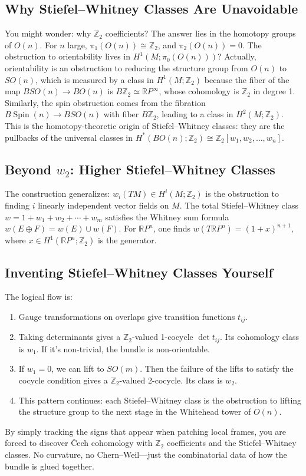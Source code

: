 \documentclass[11pt]{article}
\newcommand{\R}{\mathbb{R}}
\newcommand{\Z}{\mathbb{Z}}
\begin{document}
\subsection{Why Stiefel--Whitney Classes Are Unavoidable}
You might wonder: why \(\Z_2\) coefficients? The answer lies in the homotopy groups of \(O(n)\). For \(n\) large, \(\pi_1(O(n)) \cong \Z_2\), and \(\pi_2(O(n)) = 0\). The obstruction to orientability lives in \(H^1(M;\pi_0(O(n)))\)? Actually, orientability is an obstruction to reducing the structure group from \(O(n)\) to \(SO(n)\), which is measured by a class in \(H^1(M;\Z_2)\) because the fiber of the map \(BSO(n) \to BO(n)\) is \(B\Z_2 \simeq \R P^\infty\), whose cohomology is \(\Z_2\) in degree 1. Similarly, the spin obstruction comes from the fibration \(B\operatorname{Spin}(n) \to BSO(n)\) with fiber \(B\Z_2\), leading to a class in \(H^2(M;\Z_2)\). This is the homotopy-theoretic origin of Stiefel--Whitney classes: they are the pullbacks of the universal classes in \(H^*(BO(n);\Z_2) \cong \Z_2[w_1,w_2,\dots,w_n]\).

\subsection{Beyond \(w_2\): Higher Stiefel--Whitney Classes}
The construction generalizes: \(w_i(TM) \in H^i(M;\Z_2)\) is the obstruction to finding \(i\) linearly independent vector fields on \(M\). The total Stiefel--Whitney class \(w = 1 + w_1 + w_2 + \cdots + w_m\) satisfies the Whitney sum formula \(w(E\oplus F) = w(E) \cup w(F)\). For \(\R P^n\), one finds \(w(T\R P^n) = (1+x)^{n+1}\), where \(x \in H^1(\R P^n;\Z_2)\) is the generator.

\subsection{Inventing Stiefel--Whitney Classes Yourself}
The logical flow is:
\begin{enumerate}
    \item Gauge transformations on overlaps give transition functions \(t_{ij}\).
    \item Taking determinants gives a \(\Z_2\)-valued 1-cocycle \(\det t_{ij}\). Its cohomology class is \(w_1\). If it's non-trivial, the bundle is non-orientable.
    \item If \(w_1 = 0\), we can lift to \(SO(m)\). Then the failure of the lifts to satisfy the cocycle condition gives a \(\Z_2\)-valued 2-cocycle. Its class is \(w_2\).
    \item This pattern continues: each Stiefel--Whitney class is the obstruction to lifting the structure group to the next stage in the Whitehead tower of \(O(n)\).
\end{enumerate}
By simply tracking the signs that appear when patching local frames, you are forced to discover Čech cohomology with \(\Z_2\) coefficients and the Stiefel--Whitney classes. No curvature, no Chern--Weil---just the combinatorial data of how the bundle is glued together.
\end{document}
